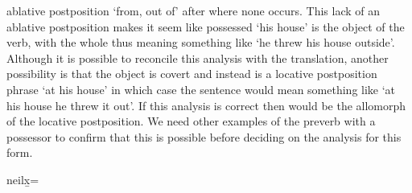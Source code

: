 \begin{morphdesc}[resume*=alphalist]
\begin{itemize}
			ablative postposition  ‘from, out of’ after  
			where none occurs.
		This lack of an ablative postposition makes it seem like possessed 
			‘his house’ is the object of the verb, with the whole thus meaning something
			like ‘he threw his house outside’.
		Although it is possible to reconcile this analysis with the translation,
			another possibility is that the object is covert and instead
			 is a locative postposition phrase ‘at his house’
			in which case the sentence would mean something like
			‘at his house he threw it out’.
		If this analysis is correct then  would be the allomorph of the locative
			postposition.
		We need other examples of the preverb  with a possessor to confirm
			that this is possible before deciding on the analysis for this form.
	\end{itemize}

\item[neilx̱=]\label{m:neilx̱=}

\end{morphdesc}
